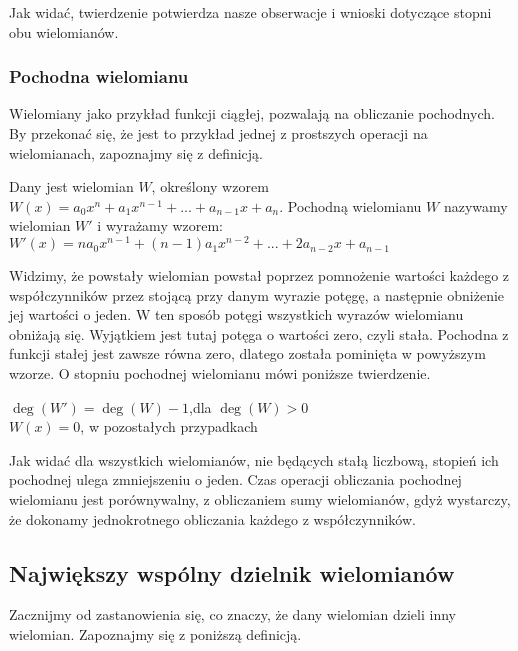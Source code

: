 Jak widać, twierdzenie potwierdza nasze obserwacje i wnioski dotyczące stopni obu wielomianów.

\subsubsection{Pochodna wielomianu}

Wielomiany jako przykład funkcji ciągłej, pozwalają na obliczanie pochodnych. By przekonać się, że jest to przykład jednej z prostszych operacji na wielomianach, zapoznajmy się z definicją.

\begin{definition}
	$ $\\
	Dany jest wielomian $W$, określony wzorem $W(x) = a_0x^n + a_1x^{n-1} + ... + a_{n-1}x + a_n$. Pochodną wielomianu $W$ nazywamy wielomian $W'$ i wyrażamy wzorem:
	$W'(x) = na_0x^{n-1} + (n-1)a_1x^{n-2} + ... + 2a_{n-2}x + a_{n-1}$
\end{definition}

Widzimy, że powstały wielomian powstał poprzez pomnożenie wartości każdego z współczynników przez stojącą przy danym wyrazie potęgę, a następnie obniżenie jej wartości o jeden. W ten sposób potęgi wszystkich wyrazów wielomianu obniżają się. Wyjątkiem jest tutaj potęga o wartości zero, czyli stała. Pochodna z funkcji stałej jest zawsze równa zero, dlatego została pominięta w powyższym wzorze. O stopniu pochodnej wielomianu mówi poniższe twierdzenie.

\begin{theorem}
	$ $\\
	$\deg(W') = \deg(W) - 1$,dla $\deg(W) > 0$ \\
	$W(x) = 0$, w pozostałych przypadkach
\end{theorem}

Jak widać dla wszystkich wielomianów, nie będących stałą liczbową, stopień ich pochodnej ulega zmniejszeniu o jeden. Czas operacji obliczania pochodnej wielomianu jest porównywalny, z obliczaniem sumy wielomianów, gdyż wystarczy, że dokonamy jednokrotnego obliczania każdego z współczynników.

\subsection{Największy wspólny dzielnik wielomianów}

Zacznijmy od zastanowienia się, co znaczy, że dany wielomian dzieli inny wielomian. Zapoznajmy się z poniższą definicją.

